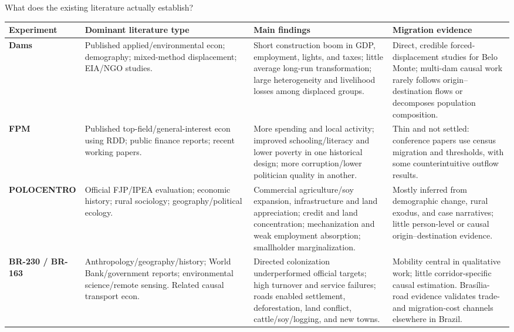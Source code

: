 \documentclass[aspectratio=169,10pt]{beamer}
\begin{document}
\begin{frame}{What does the existing literature actually establish?}
\scriptsize
\renewcommand{\arraystretch}{1.22}
\begin{tabularx}{\textwidth}{L{2.05cm}L{3.35cm}YL{3.25cm}}
\toprule
\textbf{Experiment} & \textbf{Dominant literature type} & \textbf{Main findings} & \textbf{Migration evidence} \\
\midrule
\textbf{Dams} & Published applied/environmental econ; demography; mixed-method displacement; EIA/NGO studies. & Short construction boom in GDP, employment, lights, and taxes; little average long-run transformation; large heterogeneity and livelihood losses among displaced groups. & Direct, credible forced-displacement studies for Belo Monte; multi-dam causal work rarely follows origin--destination flows or decomposes population composition. \\
\textbf{FPM} & Published top-field/general-interest econ using RDD; public finance reports; recent working papers. & More spending and local activity; improved schooling/literacy and lower poverty in one historical design; more corruption/lower politician quality in another. & Thin and not settled: conference papers use census migration and thresholds, with some counterintuitive outflow results. \\
\textbf{POLOCENTRO} & Official FJP/IPEA evaluation; economic history; rural sociology; geography/political ecology. & Commercial agriculture/soy expansion, infrastructure and land appreciation; credit and land concentration; mechanization and weak employment absorption; smallholder marginalization. & Mostly inferred from demographic change, rural exodus, and case narratives; little person-level or causal origin--destination evidence. \\
\textbf{BR-230 / BR-163} & Anthropology/geography/history; World Bank/government reports; environmental science/remote sensing. Related causal transport econ. & Directed colonization underperformed official targets; high turnover and service failures; roads enabled settlement, deforestation, land conflict, cattle/soy/logging, and new towns. & Mobility central in qualitative work; little corridor-specific causal estimation. Brasília-road evidence validates trade- and migration-cost channels elsewhere in Brazil. \\
\bottomrule
\end{tabularx}
\end{frame}
\end{document}
